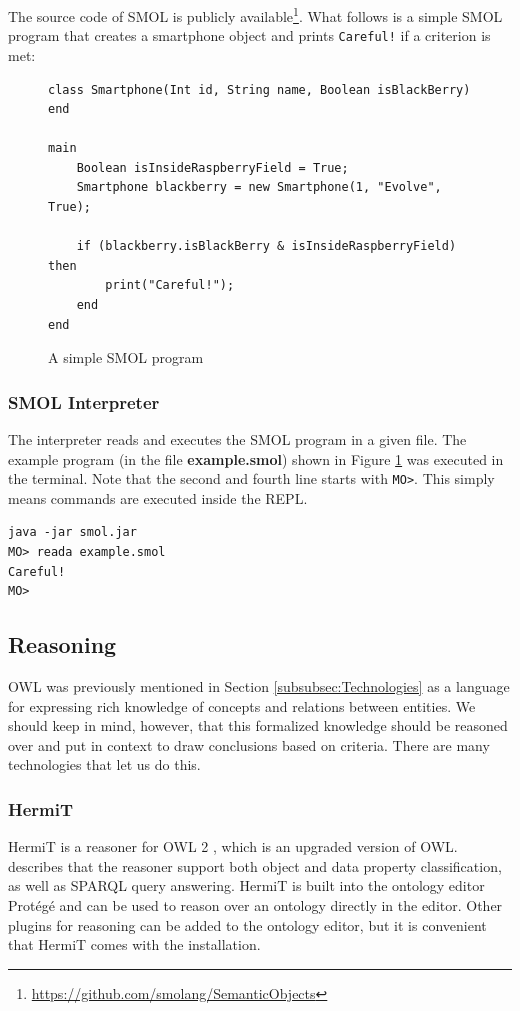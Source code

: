 \documentclass{article}
\begin{document}
The source code of SMOL is publicly available\footnote{\url{https://github.com/smolang/SemanticObjects}}. What follows is a simple SMOL program that creates a smartphone object and prints \verb|Careful!| if a criterion is met:

\begin{figure}[H]
    \centering
    \caption{A simple SMOL program}
    \label{fig:smol_program}
    \begin{Verbatim}[frame=single]
class Smartphone(Int id, String name, Boolean isBlackBerry) end

main
    Boolean isInsideRaspberryField = True;
    Smartphone blackberry = new Smartphone(1, "Evolve", True);

    if (blackberry.isBlackBerry & isInsideRaspberryField) then
        print("Careful!");
    end
end

    \end{Verbatim}
\end{figure}

\subsubsection{SMOL Interpreter}\label{subsubsec:SMOLInterpreter}
The interpreter reads and executes the SMOL program in a given file. The example program (in the file \textbf{example.smol}) shown in Figure \ref{fig:smol_program} was executed in the terminal. Note that the second and fourth line starts with \verb|MO>|. This simply means commands are executed inside the REPL.
\begin{Verbatim}[frame=single]
java -jar smol.jar
MO> reada example.smol
Careful!
MO>
\end{Verbatim}


\subsection{Reasoning}\label{subsec:Reasoning}
OWL was previously mentioned in Section \ref{subsubsec:Technologies} as a language for expressing rich knowledge of concepts and relations between entities. We should keep in mind, however, that this formalized knowledge should be reasoned over and put in context to draw conclusions based on criteria. There are many technologies that let us do this.
\subsubsection{HermiT}
HermiT is a reasoner for OWL 2 \cite{glimm_hermit_2014}, which is an upgraded version of OWL. \citeauthor{glimm_hermit_2014} describes that the reasoner support both object and data property classification, as well as SPARQL query answering. HermiT is built into the ontology editor Protégé and can be used to reason over an ontology directly in the editor. Other plugins for reasoning can be added to the ontology editor, but it is convenient that HermiT comes with the installation.
\end{document}

